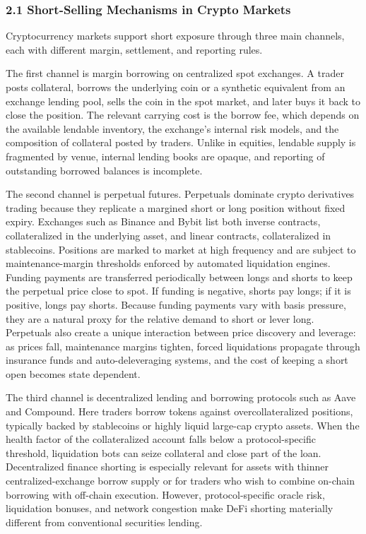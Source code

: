\documentclass[
]{article}
\begin{document}
\subsubsection{2.1 Short-Selling Mechanisms in Crypto
Markets}\label{21-short-selling-mechanisms-in-crypto-markets}

Cryptocurrency markets support short exposure through three main
channels, each with different margin, settlement, and reporting rules.

The first channel is margin borrowing on centralized spot exchanges. A
trader posts collateral, borrows the underlying coin or a synthetic
equivalent from an exchange lending pool, sells the coin in the spot
market, and later buys it back to close the position. The relevant
carrying cost is the borrow fee, which depends on the available lendable
inventory, the exchange's internal risk models, and the composition of
collateral posted by traders. Unlike in equities, lendable supply is
fragmented by venue, internal lending books are opaque, and reporting of
outstanding borrowed balances is incomplete.

The second channel is perpetual futures. Perpetuals dominate crypto
derivatives trading because they replicate a margined short or long
position without fixed expiry. Exchanges such as Binance and Bybit list
both inverse contracts, collateralized in the underlying asset, and
linear contracts, collateralized in stablecoins. Positions are marked to
market at high frequency and are subject to maintenance-margin
thresholds enforced by automated liquidation engines. Funding payments
are transferred periodically between longs and shorts to keep the
perpetual price close to spot. If funding is negative, shorts pay longs;
if it is positive, longs pay shorts. Because funding payments vary with
basis pressure, they are a natural proxy for the relative demand to
short or lever long. Perpetuals also create a unique interaction between
price discovery and leverage: as prices fall, maintenance margins
tighten, forced liquidations propagate through insurance funds and
auto-deleveraging systems, and the cost of keeping a short open becomes
state dependent.

The third channel is decentralized lending and borrowing protocols such
as Aave and Compound. Here traders borrow tokens against
overcollateralized positions, typically backed by stablecoins or highly
liquid large-cap crypto assets. When the health factor of the
collateralized account falls below a protocol-specific threshold,
liquidation bots can seize collateral and close part of the loan.
Decentralized finance shorting is especially relevant for assets with
thinner centralized-exchange borrow supply or for traders who wish to
combine on-chain borrowing with off-chain execution. However,
protocol-specific oracle risk, liquidation bonuses, and network
congestion make DeFi shorting materially different from conventional
securities lending.
\end{document}
